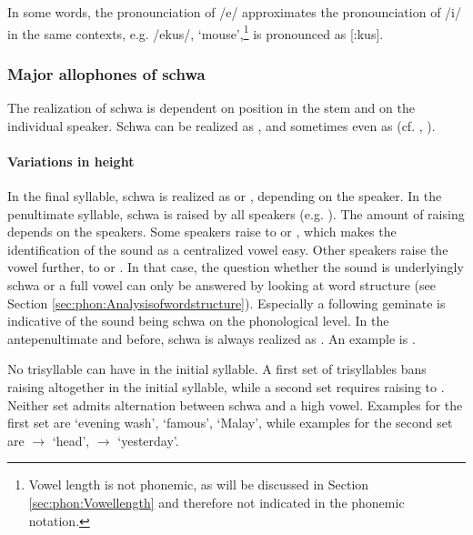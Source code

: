 


 In  some words, the pronounciation of /e/ approximates the pronounciation of /i/ in the same contexts, e.g. /\dentt ekus/, `mouse',\footnote{Vowel length is not phonemic, as will be discussed in Section \ref{sec:phon:Vowellength} and therefore not indicated in the phonemic notation.}  is pronounced as [\dentt{}:kus].


\subsubsection{Major  allophones of schwa}\label{sec:phon:Majorallophonesofschwa}
The realization of schwa is dependent on position in the stem and on the individual speaker. Schwa can be realized as , and sometimes even as  (cf. \citet[27f]{Adelaar1991}, \citet{SmithEtAl2004}).


\paragraph{Variations in height}
In the final syllable, schwa is realized as  or , depending on the speaker. In the penultimate syllable, schwa is raised by all speakers (e.g. ). The amount of raising depends on the speakers. Some speakers raise to  or , which makes the identification of the sound as a centralized vowel easy. Other speakers raise the vowel further, to  or . In that case, the question  whether the sound is underlyingly schwa or a full vowel can only be answered by looking at word structure (see Section \ref{sec:phon:Analysisofwordstructure}). Especially a following geminate is indicative of the sound being schwa on the phonological level. In the antepenultimate and before, schwa is always realized as . An example is .

No trisyllable can have  in the initial syllable. A first set of trisyllables bans raising altogether in the initial syllable, while a second set requires raising to . Neither set admits alternation between schwa and a high vowel. Examples for the first set are `evening wash',  `famous',  `Malay', while examples for the second set are  $\to$  `head',  $\to$  `yesterday'.


